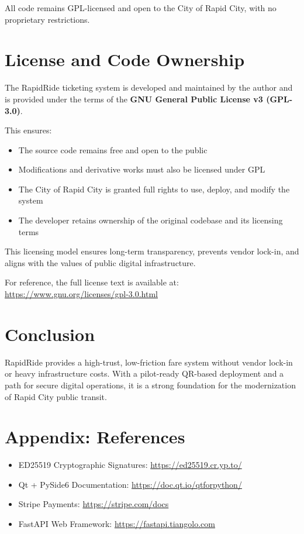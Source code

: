 \documentclass[12pt]{article}
\begin{document}
All code remains GPL-licensed and open to the City of Rapid City, with no proprietary restrictions.

\section{License and Code Ownership}

The RapidRide ticketing system is developed and maintained by the author and is provided under the terms of the \textbf{GNU General Public License v3 (GPL-3.0)}.

This ensures:
\begin{itemize}
    \item The source code remains free and open to the public
    \item Modifications and derivative works must also be licensed under GPL
    \item The City of Rapid City is granted full rights to use, deploy, and modify the system
    \item The developer retains ownership of the original codebase and its licensing terms
\end{itemize}

This licensing model ensures long-term transparency, prevents vendor lock-in, and aligns with the values of public digital infrastructure.

For reference, the full license text is available at: \url{https://www.gnu.org/licenses/gpl-3.0.html}



\section{Conclusion}
RapidRide provides a high-trust, low-friction fare system without vendor lock-in or heavy infrastructure costs. With a pilot-ready QR-based deployment and a path for secure digital operations, it is a strong foundation for the modernization of Rapid City public transit.

\appendix
\section{Appendix: References}
\begin{itemize}
    \item ED25519 Cryptographic Signatures: \url{https://ed25519.cr.yp.to/}
    \item Qt + PySide6 Documentation: \url{https://doc.qt.io/qtforpython/}
    \item Stripe Payments: \url{https://stripe.com/docs}
    \item FastAPI Web Framework: \url{https://fastapi.tiangolo.com}
\end{itemize}
\end{document}
